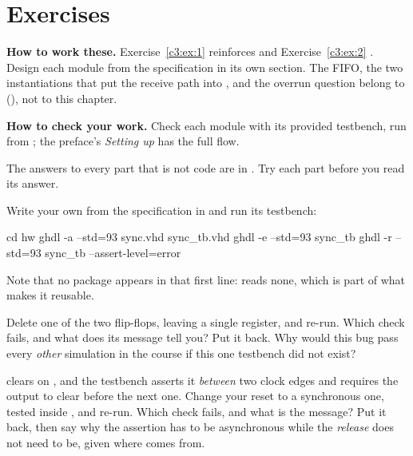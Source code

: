
\section{Exercises}
\label{c3:sec:exercises}\label{c3:app:c}

\begin{aside}
\textbf{How to work these.} Exercise~\ref{c3:ex:1} reinforces  and
Exercise~\ref{c3:ex:2} . Design each module from the specification in its
own section. The FIFO, the two instantiations that put the receive path into , and
the overrun question belong to  (), not to this chapter.

\textbf{How to check your work.} Check each module with its provided testbench, run from
; the preface's \emph{Setting up} has the full flow.

The answers to every part that is not code are in . Try each part before you read its
answer.
\end{aside}

\label{c3:ex:1}

 Write your own  from the specification in  and run its
testbench:

\begin{shell}
cd hw
ghdl -a --std=93 sync.vhd sync_tb.vhd
ghdl -e --std=93 sync_tb
ghdl -r --std=93 sync_tb --assert-level=error
\end{shell}

\noindent Note that no package appears in that first line:  reads none, which is part of
what makes it reusable.

 Delete one of the two flip-flops, leaving a single register, and re-run. Which check
fails, and what does its message tell you? Put it back. Why would this bug pass every \emph{other}
simulation in the course if this one testbench did not exist?

  clears on , and the testbench asserts it \emph{between} two
clock edges and requires the output to clear before the next one. Change your reset to a
synchronous one, tested inside , and re-run. Which check fails, and what
is the message? Put it back, then say why the assertion has to be asynchronous while the
\emph{release} does not need to be, given where  comes from.

